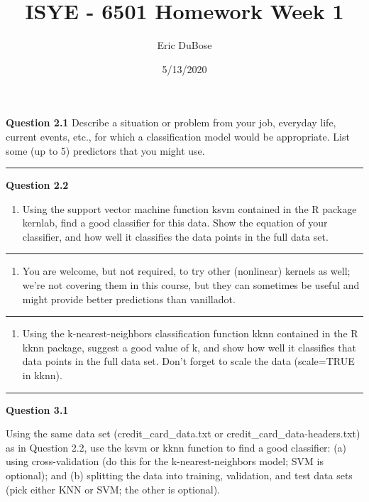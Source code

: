 \documentclass[
]{article}
\title{ISYE - 6501 Homework Week 1}
\author{Eric DuBose}
\date{5/13/2020}
\providecommand{\tightlist}{%
  \setlength{\itemsep}{0pt}\setlength{\parskip}{0pt}}
\begin{document}
\maketitle

\textbf{Question 2.1} Describe a situation or problem from your job,
everyday life, current events, etc., for which a classification model
would be appropriate. List some (up to 5) predictors that you might use.

\begin{center}\rule{0.5\linewidth}{0.5pt}\end{center}

\textbf{Question 2.2}

\begin{enumerate}
\def\labelenumi{\arabic{enumi}.}
\tightlist
\item
  Using the support vector machine function ksvm contained in the R
  package kernlab, find a good classifier for this data. Show the
  equation of your classifier, and how well it classifies the data
  points in the full data set.
\end{enumerate}

\begin{center}\rule{0.5\linewidth}{0.5pt}\end{center}

\begin{enumerate}
\def\labelenumi{\arabic{enumi}.}
\setcounter{enumi}{1}
\tightlist
\item
  You are welcome, but not required, to try other (nonlinear) kernels as
  well; we're not covering them in this course, but they can sometimes
  be useful and might provide better predictions than vanilladot.
\end{enumerate}

\begin{center}\rule{0.5\linewidth}{0.5pt}\end{center}

\begin{enumerate}
\def\labelenumi{\arabic{enumi}.}
\setcounter{enumi}{2}
\tightlist
\item
  Using the k-nearest-neighbors classification function kknn contained
  in the R kknn package, suggest a good value of k, and show how well it
  classifies that data points in the full data set. Don't forget to
  scale the data (scale=TRUE in kknn).
\end{enumerate}

\begin{center}\rule{0.5\linewidth}{0.5pt}\end{center}

\textbf{Question 3.1}

Using the same data set (credit\_card\_data.txt or
credit\_card\_data-headers.txt) as in Question 2.2, use the ksvm or kknn
function to find a good classifier: (a) using cross-validation (do this
for the k-nearest-neighbors model; SVM is optional); and (b) splitting
the data into training, validation, and test data sets (pick either KNN
or SVM; the other is optional).
\end{document}
